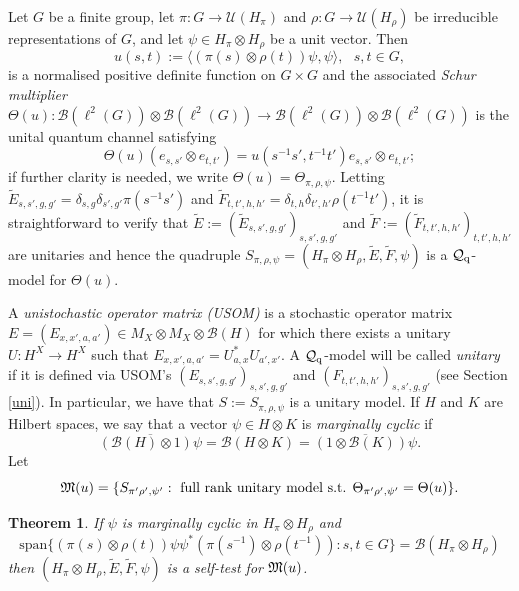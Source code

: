 \documentclass[11pt]{amsart}
\newtheorem{theorem}{Theorem}[section]
\theoremstyle{definition}
\newcommand{\cl}[1]{\mathcal{#1}}
\newcommand{\la}{\langle}
\newcommand{\ra}{\rangle}
\newcommand{\ten}{\otimes}
\begin{document}
Let $G$ be a finite group, let $\pi:G\to\cl{U}(H_\pi)$ and $\rho : G\to\cl{U}(H_\rho)$ be irreducible representations of $G$, and let $\psi\in H_\pi\ten H_\rho$ be a unit vector. Then
$$u(s,t):=\la (\pi(s)\ten\rho(t))\psi,\psi\ra, \ \ \ s,t\in G,$$
is a normalised positive definite function on $G\times G$ and the associated 
\emph{Schur multiplier} $\Theta(u):\cl{B}(\ell^2(G))\ten \cl{B}(\ell^2(G))\to \cl{B}(\ell^2(G))\ten \cl{B}(\ell^2(G))$ is the unital quantum channel satisfying
\begin{equation}\label{e:schur}\Theta(u)(e_{s,s'}\ten e_{t,t'})=u(s^{-1}s',t^{-1}t')e_{s,s'}\ten e_{t,t'};
\end{equation}
if further clarity is needed, we write $\Theta(u) = \Theta_{\pi,\rho,\psi}$. 
Letting $\widetilde{E}_{s,s',g,g'}=\delta_{s,g}\delta_{s',g'}\pi(s^{-1}s')$ and $\widetilde{F}_{t,t',h,h'}=\delta_{t,h}\delta_{t',h'}\rho(t^{-1}t')$, 
it is straightforward to verify that 
$\widetilde{E} := (\widetilde{E}_{s,s',g,g'})_{s,s',g,g'}$ and 
$\widetilde{F} := (\widetilde{F}_{t,t',h,h'})_{t,t',h,h'}$ are unitaries and hence 
the quadruple 
$S_{\pi,\rho,\psi} = (H_\pi\ten H_\rho, \widetilde{E},\widetilde{F},\psi)$ is a $\cl{Q}_{\rm q}$-model for $\Theta(u)$.


A \textit{unistochastic operator matrix (USOM)} 
is a stochastic operator matrix $E=(E_{x,x',a,a'})\in M_X\ten M_X\ten \cl{B}(H)$ for which there exists a unitary $U:H^X\to H^X$ such that $E_{x,x',a,a'}=U_{a,x}^*U_{a',x'}$. 
A $\cl{Q}_{\rm q}$-model will be called {\it unitary} if it is defined via USOM's $(E_{s,s',g,g'})_{s,s',g,g'}$ and $(F_{t,t',h,h'})_{s,s',g,g'}$ (see Section \ref{uni}). In particular, we have that $S := S_{\pi,\rho,\psi}$ is a unitary model.  
If $H$ and $K$ are Hilbert spaces, we say that a vector $\psi\in H\otimes K$ is 
\emph{marginally cyclic} if 
$$\overline{(\cl B(H)\otimes 1)\psi} = \cl B(H\otimes K) = \overline{(1\otimes \cl B(K))\psi}.$$
Let 
$$\frak{M}(u) = \{S_{\pi'\rho',\psi'} : 
\mbox{ full rank unitary model s.t. }
\Theta_{\pi'\rho',\psi'} = \Theta(u)\}.$$


\begin{theorem}\label{p:prop} 
If $\psi$ is marginally cyclic in $H_{\pi}\otimes H_{\rho}$ and 
\begin{equation}\label{e:ext}\mathrm{span}\{(\pi(s)\ten\rho(t))\psi\psi^*(\pi(s^{-1})\ten\rho(t^{-1})) : s,t\in G\}=\cl{B}(H_\pi\ten H_\rho)\end{equation}
then $(H_\pi\ten H_\rho, \widetilde{E},\widetilde{F},\psi)$ is a self-test for $\frak{M}(u)$.
\end{theorem}
\end{document}
